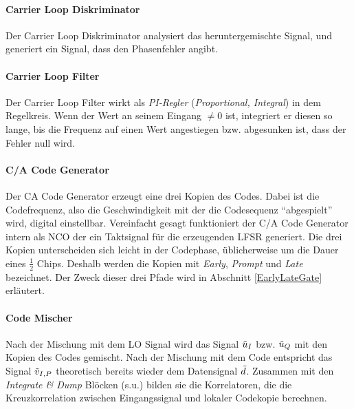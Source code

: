 \paragraph{Carrier Loop Diskriminator} Der Carrier Loop Diskriminator analysiert das heruntergemischte Signal, und generiert ein Signal, dass den Phasenfehler angibt.

\paragraph{Carrier Loop Filter} Der Carrier Loop Filter wirkt als \emph{PI-Regler} (\emph{Proportional, Integral}) in dem Regelkreis. Wenn der Wert an seinem Eingang $\neq 0$ ist, integriert er diesen so lange, bis die Frequenz auf einen Wert angestiegen bzw. abgesunken ist, dass der Fehler null wird.

\paragraph{C/A Code Generator} Der \gls{CA} Code Generator erzeugt eine drei Kopien des Codes. Dabei ist die Codefrequenz, also die Geschwindigkeit mit der die Codesequenz \enquote{abgespielt} wird, digital einstellbar. Vereinfacht gesagt  funktioniert der C/A Code Generator intern als \gls{NCO} der ein Taktsignal für die erzeugenden \gls{LFSR} generiert. Die drei Kopien unterscheiden sich leicht in der Codephase, üblicherweise um die Dauer eines $\frac{1}{2}$ Chips. Deshalb werden die Kopien mit \emph{Early}, \emph{Prompt} und \emph{Late} bezeichnet. Der Zweck dieser drei Pfade wird in Abschnitt \ref{EarlyLateGate} erläutert.

\paragraph{Code Mischer} Nach der Mischung mit dem LO Signal wird das Signal $\tilde{u}_I$ bzw. $\tilde{u}_Q$ mit den Kopien des Codes gemischt. Nach der Mischung mit dem Code entspricht das Signal $\tilde{v}_{I,P}$ theoretisch bereits wieder dem Datensignal $\tilde{d}$. Zusammen mit den \emph{Integrate \& Dump} Blöcken (s.u.) bilden sie die Korrelatoren, die die Kreuzkorrelation zwischen Eingangssignal und lokaler Codekopie berechnen.

